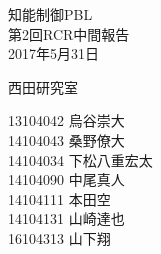 \begin{titlepage}

  \vspace*{25mm}

  \begin{center}
    {\huge 知能制御PBL\\}
    \vspace{5mm}
    {\Huge 第2回RCR中間報告\\}
    \vspace{20mm}
    {\Large 2017年5月31日}

    \vspace{25mm}

    {\LARGE 西田研究室\\}

    \vspace{10mm}

    {\Large
   13104042 烏谷崇大　　\\
   14104043 桑野僚大　　\\
   14104034 下松八重宏太\\
   14104090 中尾真人　　\\
   14104111 本田空　　　\\
   14104131 山崎達也　　\\
   16104313 山下翔　　　\\
}

  \end{center}

\end{titlepage}
